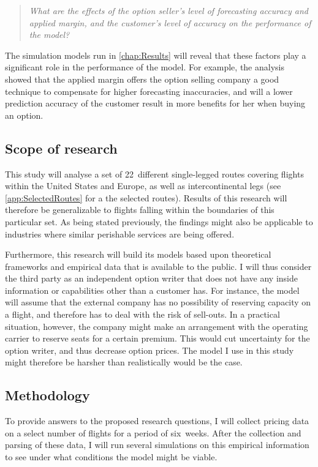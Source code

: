 \begin{quote}\emph{What are the effects of the option seller's level of forecasting accuracy and applied margin, and the customer's level of accuracy on the performance of the model?}\end{quote}

The simulation models run in \autoref{chap:Results} will reveal that these factors play a significant role in the performance of the model. For example, the analysis showed that the applied margin offers the option selling company a good technique to compensate for higher forecasting inaccuracies, and will a lower prediction accuracy of the customer result in more benefits for her when buying an option.


\subsection{Scope of research}
This study will analyse a set of 22~different single-legged routes covering flights within the United States and Europe, as well as intercontinental legs (see \autoref{app:SelectedRoutes} for a the selected routes). Results of this research will therefore be generalizable to flights falling within the boundaries of this particular set. As being stated previously, the findings might also be applicable to industries where similar perishable services are being offered.

Furthermore, this research will build its models based upon theoretical frameworks and empirical data that is available to the public. I will thus consider the third party as an independent option writer that does not have any inside information or capabilities other than a customer has. For instance, the model will assume that the external company has no possibility of reserving capacity on a flight, and therefore has to deal with the risk of sell-outs. In a practical situation, however, the company might make an arrangement with the operating carrier to reserve seats for a certain premium. This would cut uncertainty for the option writer, and thus decrease option prices. The model I use in this study might therefore be harsher than realistically would be the case.


\subsection{Methodology}
To provide answers to the proposed research questions, I will collect pricing data on a select number of flights for a period of six~weeks. After the collection and parsing of these data, I will run several simulations on this empirical information to see under what conditions the model might be viable.

